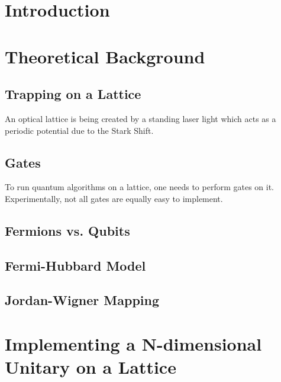 \documentclass[12pt,twoside]{report}  %
\begin{document}
\chapter{Introduction}

\chapter{Theoretical Background}
\section{Trapping on a Lattice}
An optical lattice is being created by a standing laser light which acts as a periodic potential due to the Stark Shift. 
\section{Gates}
To run quantum algorithms on a lattice, one needs to perform gates on it. Experimentally, not all gates are equally easy to implement. \\

\section{Fermions vs. Qubits}

\section{Fermi-Hubbard Model}


\section{Jordan-Wigner Mapping}

\chapter{Implementing a N-dimensional Unitary on a Lattice}
\end{document}
